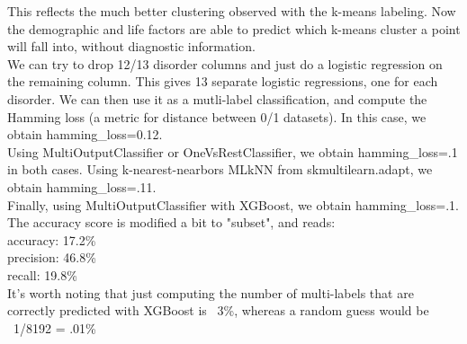 \documentclass[11pt]{amsart}
\begin{document}
This reflects the much better clustering observed with the k-means labeling. Now the demographic and life factors are able to predict which k-means cluster a point will fall into, without diagnostic information. \\

We can try to drop 12/13 disorder columns and just do a logistic regression on the remaining column. This gives 13 separate logistic regressions, one for each disorder. We can then use it as a mutli-label classification, and compute the Hamming loss (a metric for distance between 0/1 datasets). In this case, we obtain hamming\_loss=0.12. \\

Using MultiOutputClassifier or OneVsRestClassifier, we obtain hamming\_loss=.1 in both cases. Using k-nearest-nearbors MLkNN from skmultilearn.adapt, we obtain hamming\_loss=.11. \\

Finally, using MultiOutputClassifier with XGBoost, we obtain hamming\_loss=.1. The accuracy score is modified a bit to "subset", and reads: \\

\noindent accuracy: 17.2\% \\
precision: 46.8\% \\
recall: 19.8\% \\

It's worth noting that just computing the number of multi-labels that are correctly predicted with XGBoost is ~3\%, whereas a random guess would be ~1/8192 = .01\%
\end{document}
